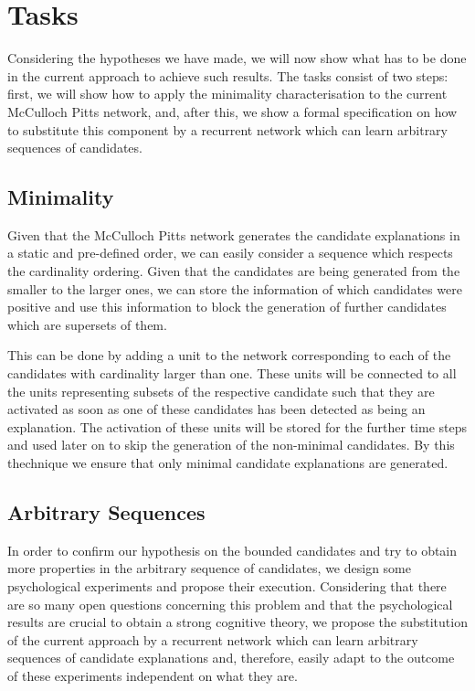 \section{Tasks}

Considering the hypotheses we have made, we will now show what has to be done in the current approach to achieve such results. The tasks consist of two steps: first, we will show how to apply the minimality characterisation to the current McCulloch Pitts network, and, after this, we show a formal specification on how to substitute this component by a recurrent network which can learn arbitrary sequences of candidates.

\subsection{Minimality}

Given that the McCulloch Pitts network generates the candidate explanations in a static and pre-defined order, we can easily consider a sequence which respects the cardinality ordering. Given that the candidates are being generated from the smaller to the larger ones, we can store the information of which candidates were positive and use this information to block the generation of further candidates which are supersets of them. 

This can be done by adding a unit to the network corresponding to each of the candidates with cardinality larger than one. These units will be connected to all the units representing subsets of the respective candidate such that they are activated as soon as one of these candidates has been detected as being an explanation. The activation of these units will be stored for the further time steps and used later on to skip the generation of the non-minimal candidates. By this thechnique we ensure that only minimal candidate explanations are generated.

\subsection{Arbitrary Sequences}

In order to confirm our hypothesis on the bounded candidates and try to obtain more properties in the arbitrary sequence of candidates, we design some psychological experiments and propose their execution. Considering that there are so many open questions concerning this problem and that the psychological results are crucial to obtain a strong cognitive theory, we propose the substitution of the current approach by a recurrent network which can learn arbitrary sequences of candidate explanations and, therefore, easily adapt to the outcome of these experiments independent on what they are.

